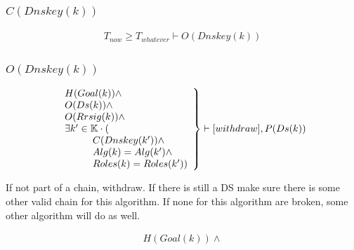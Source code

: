\documentclass[twoside,english, a4paper]{article}
\newcommand{\highlightMinSig}[1]{\textcolor{MinSig}{\bf{#1}}}
\newcommand{\mathbox}[1]{#1}
\begin{document}
\subsubsection{$C(Dnskey(k))$}
\highlightMinSig{
	\begin{equation}
		\begin{split}
			 T_{now} \geq T_{whatever} \vdash O(Dnskey(k))
		\end{split}
	\end{equation}
}

\subsubsection{$O(Dnskey(k))$}

\mathbox{

\highlightMinSig{
	\begin{equation}
		\left.
		\begin{array}{l}
\hskip 0cm				H(Goal(k)) \wedge \\
\hskip 0cm				O(Ds(k)) \wedge \\
\hskip 0cm				O(Rrsig(k)) \wedge \\
\hskip 0cm				\exists k' \in \mathbb{K} \cdot (\\
\hskip 1cm					C(Dnskey(k')) \wedge \\
\hskip 1cm					Alg(k)=Alg(k') \wedge \\
\hskip 1cm					Roles(k) = Roles(k'))\\
		\end{array}
		\right\} \vdash [withdraw], P(Ds(k)) \\
	\end{equation}
	}

	If not part of a chain, withdraw. If there is still a DS make sure 
	there is some other valid chain for this algorithm. If none for 
	this algorithm are broken, some other algorithm will do as well.
	
	\begin{equation}
		\left.
		\begin{array}{l}
			H(Goal(k)) \wedge \\


\end{array}
\end{equation}}
\end{document}
